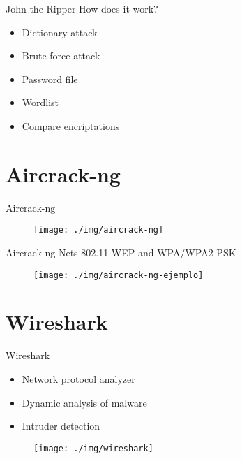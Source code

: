 \documentclass{beamer}
\begin{document}
\begin{frame}{John the Ripper}
  How does it work?
  \begin{itemize}
  \item<1,3> Dictionary attack
  \item<3> Brute force attack
  \end{itemize}
  \begin{itemize}
  \item<2> Password file
  \item<2> Wordlist
  \item<2> Compare encriptations
  \end{itemize}
\end{frame}


\section{Aircrack-ng}
\begin{frame}{Aircrack-ng}
    \begin{figure}[h]
    \centering
    \texttt{[image: ./img/aircrack-ng]}
  \end{figure}
\end{frame}

\begin{frame}{Aircrack-ng}
  Nets 802.11 WEP and WPA/WPA2-PSK
      \begin{figure}[h]
    \centering
    \texttt{[image: ./img/aircrack-ng-ejemplo]}
  \end{figure}
\end{frame}

\section{Wireshark}
\begin{frame}{Wireshark}
  \begin{itemize}
  \item Network protocol analyzer
  \item Dynamic analysis of malware
  \item Intruder detection
  \end{itemize}

      \begin{figure}[h]
    \centering
    \texttt{[image: ./img/wireshark]}
  \end{figure}
\end{frame}
\end{document}
